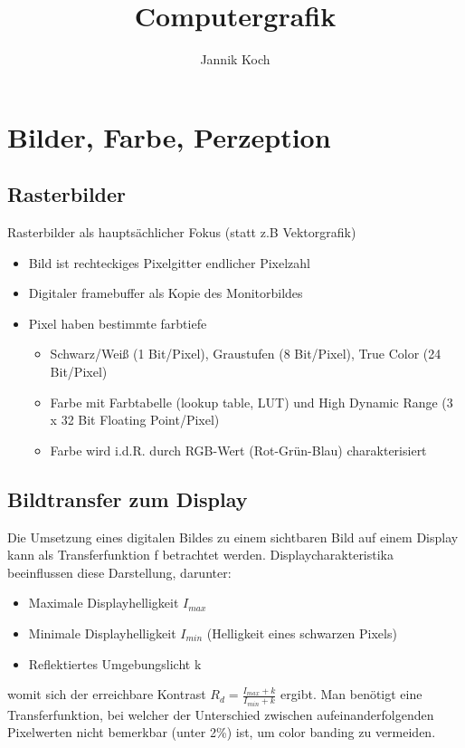 \documentclass[10pt,a4paper]{article}
\author{Jannik Koch}
\title{Computergrafik}
\begin{document}
	{\let\newpage\relax\maketitle}
	\tableofcontents
	\newpage
	\setcounter{page}{1}

	\section{Bilder, Farbe, Perzeption}
	\subsection{Rasterbilder}
	Rasterbilder als hauptsächlicher Fokus (statt z.B Vektorgrafik)
	\begin{itemize}
		\item Bild ist rechteckiges Pixelgitter endlicher Pixelzahl
		\item Digitaler \Gls{framebuffer} als Kopie des Monitorbildes
		\item Pixel haben bestimmte \Gls{farbtiefe}
		\begin{itemize}
			\item Schwarz/Weiß (1 Bit/Pixel), Graustufen (8 Bit/Pixel), True Color (24 Bit/Pixel)
			\item Farbe mit Farbtabelle (lookup table, \glqq LUT\grqq) und High Dynamic Range (3 x 32 Bit Floating Point/Pixel)
			\item Farbe wird i.d.R. durch RGB-Wert (Rot-Grün-Blau) charakterisiert
		\end{itemize}
	\end{itemize}

	\subsection{Bildtransfer zum Display}
	Die Umsetzung eines digitalen Bildes zu einem sichtbaren Bild auf einem Display kann als Transferfunktion f betrachtet werden. Displaycharakteristika beeinflussen diese Darstellung, darunter:
	\begin{itemize}
		\item Maximale Displayhelligkeit $I_{max}$
		\item Minimale Displayhelligkeit $I_{min}$ (Helligkeit eines schwarzen Pixels)
		\item Reflektiertes Umgebungslicht k
	\end{itemize}
	womit sich der erreichbare Kontrast $R_d = \frac{I_{max} + k}{I_{min} + k}$ ergibt. Man benötigt eine Transferfunktion, bei welcher der Unterschied zwischen aufeinanderfolgenden Pixelwerten nicht bemerkbar (unter 2\%) ist, um \Gls{color banding} zu vermeiden.
\end{document}
